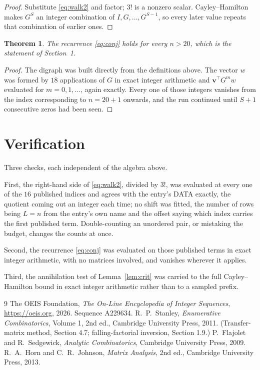 \documentclass[11pt,a4paper]{article}
\theoremstyle{plain}
\newtheorem{theorem}{Theorem}
\theoremstyle{definition}
\begin{document}
\begin{proof}
Substitute \eqref{eq:walk2} and factor; $3!$ is a nonzero scalar. Cayley--Hamilton
makes $G^{S}$ an integer combination of $I,G,\dots,G^{S-1}$, so every later value repeats
that combination of earlier ones.
\end{proof}

\begin{theorem}
The recurrence \eqref{eq:conj} holds for every $n>20$, which is the statement of
Section~1.
\end{theorem}

\begin{proof}
The digraph was built directly from the definitions above. The vector $w$ was formed by
$18$ applications of $G$ in exact integer arithmetic and $\mathbf{v}^{\!\top}G^{m}w$
evaluated for $m=0,1,\dots$, again exactly. Every one of those integers vanishes from the
index corresponding to $n=20+1$ onwards, and the run continued until $S+1$ consecutive
zeros had been seen.
\end{proof}

\section{Verification}

Three checks, each independent of the algebra above.

First, the right-hand side of \eqref{eq:walk2}, divided by $3!$, was evaluated at every
one of the $16$ published indices and agrees with the entry's DATA exactly, the quotient
coming out an integer each time; no shift was fitted, the number of rows being $L=n$
from the entry's own name and the offset saying which index carries the first published term.
Double-counting an unordered pair, or mistaking the budget, changes the counts at once.

Second, the recurrence \eqref{eq:conj} was evaluated on those published terms in exact
integer arithmetic, with no matrices involved, and vanishes wherever it applies.

Third, the annihilation test of Lemma~\ref{lem:crit} was carried to the full
Cayley--Hamilton bound in exact integer arithmetic rather than to a sampled prefix.

\begin{thebibliography}{9}
 The OEIS Foundation, \emph{The On-Line Encyclopedia of Integer
Sequences}, \url{https://oeis.org}, 2026. Sequence A229634.
 R.~P.~Stanley, \emph{Enumerative Combinatorics}, Volume 1, 2nd ed.,
Cambridge University Press, 2011. (Transfer-matrix method, Section 4.7; falling-factorial
inversion, Section 1.9.)
 P.~Flajolet and R.~Sedgewick, \emph{Analytic Combinatorics}, Cambridge
University Press, 2009.
 R.~A.~Horn and C.~R.~Johnson, \emph{Matrix Analysis}, 2nd ed., Cambridge
University Press, 2013.
\end{thebibliography}
\end{document}
